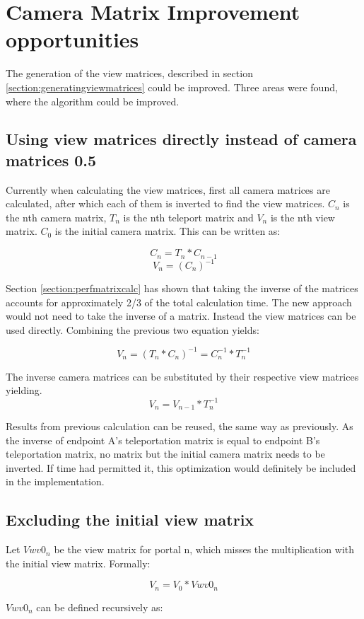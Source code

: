 \section{Camera Matrix Improvement opportunities}
The generation of the view matrices, described in section \ref{section:generatingviewmatrices} could be improved. Three areas were found, where the algorithm could be improved.

\subsection{Using view matrices directly instead of camera matrices 0.5}
Currently when calculating the view matrices, first all camera matrices are calculated, after which each of them is inverted to find the view matrices. $C_n$ is the nth camera matrix, $T_n$ is the nth teleport matrix and $V_n$ is the nth view matrix. $C_0$ is the initial camera matrix. This can be written as:

$$C_n = T_{n} * C_{n-1}$$
$$V_n = (C_{n})^{-1}$$

Section \ref{section:perfmatrixcalc} has shown that taking the inverse of the matrices accounts for approximately 2/3 of the total calculation time. The new approach would not need to take the inverse of a matrix. Instead the view matrices can be used directly.
Combining the previous two equation yields:

$$V_n = (T_n * C_n)^{-1} = C_n^{-1} * T_n^{-1}$$

The inverse camera matrices can be substituted by their respective view matrices yielding.
$$V_n = V_{n-1} * T_n^{-1}$$

Results from previous calculation can be reused, the same way as previously. As the inverse of \gls{endpoint} A's teleportation matrix is equal to \gls{endpoint} B's teleportation matrix, no matrix but the initial camera matrix needs to be inverted. If time had permitted it, this optimization would definitely be included in the implementation.

\subsection{Excluding the initial view matrix}
\label{section:noveiw}
Let $Vwv0_n$ be the view matrix for portal n, which misses the multiplication with the initial view matrix. Formally:

$$V_n = V_0 * Vwv0_n$$

$Vwv0_n$ can be defined recursively as:

